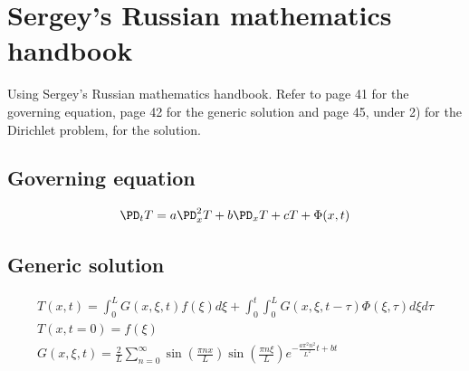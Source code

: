 \documentclass[11pt]{article}
\begin{document}
\section{Sergey's Russian mathematics handbook}
Using Sergey's Russian mathematics handbook. Refer to page 41 for the governing equation, page 42 for the generic solution and page 45, under 2) for the Dirichlet problem, for the solution.
\subsection{Governing equation}
\begin{equation}\begin{aligned}
\PD_t T = a \PD_x^2 T + b \PD_x T +c T + \Phi(x,t) \\
\end{aligned} \end{equation}
\subsection{Generic solution}
\begin{equation}\begin{aligned}
T(x,t) = \int_0^L G(x,\xi,t) f(\xi) d\xi + \int_0^t \int_0^L G(x,\xi,t-\tau) \Phi(\xi,\tau) d\xi d\tau \\
T(x,t=0) = f(\xi) \\
G(x,\xi,t) = \frac{2}{L} \sum_{n=0}^{\infty}
\sin\left(\frac{\pi n x}{L}\right)
\sin\left(\frac{\pi n \xi}{L}\right)
e^{- \frac{a\pi^2n^2}{L^2}t + bt }
\\
\end{aligned} \end{equation}
\end{document}
